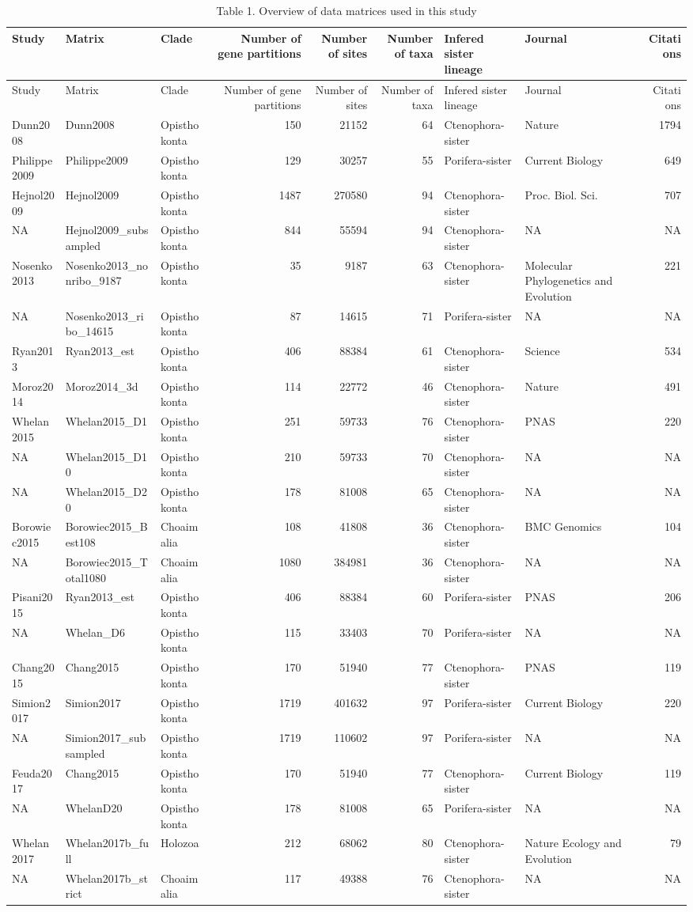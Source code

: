 \documentclass[]{article}
\begin{document}
\begin{longtable}[]{@{}lllrrrllr@{}}
\caption{Table 1. Overview of data matrices used in this
study}\tabularnewline
\toprule
Study & Matrix & Clade & Number of gene partitions & Number of sites &
Number of taxa & Infered sister lineage & Journal &
Citations\tabularnewline
\midrule
\endfirsthead
\toprule
Study & Matrix & Clade & Number of gene partitions & Number of sites &
Number of taxa & Infered sister lineage & Journal &
Citations\tabularnewline
\midrule
\endhead
Dunn2008 & Dunn2008 & Opisthokonta & 150 & 21152 & 64 &
Ctenophora-sister & Nature & 1794\tabularnewline
Philippe2009 & Philippe2009 & Opisthokonta & 129 & 30257 & 55 &
Porifera-sister & Current Biology & 649\tabularnewline
Hejnol2009 & Hejnol2009 & Opisthokonta & 1487 & 270580 & 94 &
Ctenophora-sister & Proc. Biol. Sci. & 707\tabularnewline
NA & Hejnol2009\_subsampled & Opisthokonta & 844 & 55594 & 94 &
Ctenophora-sister & NA & NA\tabularnewline
Nosenko2013 & Nosenko2013\_nonribo\_9187 & Opisthokonta & 35 & 9187 & 63
& Ctenophora-sister & Molecular Phylogenetics and Evolution &
221\tabularnewline
NA & Nosenko2013\_ribo\_14615 & Opisthokonta & 87 & 14615 & 71 &
Porifera-sister & NA & NA\tabularnewline
Ryan2013 & Ryan2013\_est & Opisthokonta & 406 & 88384 & 61 &
Ctenophora-sister & Science & 534\tabularnewline
Moroz2014 & Moroz2014\_3d & Opisthokonta & 114 & 22772 & 46 &
Ctenophora-sister & Nature & 491\tabularnewline
Whelan2015 & Whelan2015\_D1 & Opisthokonta & 251 & 59733 & 76 &
Ctenophora-sister & PNAS & 220\tabularnewline
NA & Whelan2015\_D10 & Opisthokonta & 210 & 59733 & 70 &
Ctenophora-sister & NA & NA\tabularnewline
NA & Whelan2015\_D20 & Opisthokonta & 178 & 81008 & 65 &
Ctenophora-sister & NA & NA\tabularnewline
Borowiec2015 & Borowiec2015\_Best108 & Choaimalia & 108 & 41808 & 36 &
Ctenophora-sister & BMC Genomics & 104\tabularnewline
NA & Borowiec2015\_Total1080 & Choaimalia & 1080 & 384981 & 36 &
Ctenophora-sister & NA & NA\tabularnewline
Pisani2015 & Ryan2013\_est & Opisthokonta & 406 & 88384 & 60 &
Porifera-sister & PNAS & 206\tabularnewline
NA & Whelan\_D6 & Opisthokonta & 115 & 33403 & 70 & Porifera-sister & NA
& NA\tabularnewline
Chang2015 & Chang2015 & Opisthokonta & 170 & 51940 & 77 &
Ctenophora-sister & PNAS & 119\tabularnewline
Simion2017 & Simion2017 & Opisthokonta & 1719 & 401632 & 97 &
Porifera-sister & Current Biology & 220\tabularnewline
NA & Simion2017\_subsampled & Opisthokonta & 1719 & 110602 & 97 &
Porifera-sister & NA & NA\tabularnewline
Feuda2017 & Chang2015 & Opisthokonta & 170 & 51940 & 77 &
Ctenophora-sister & Current Biology & 119\tabularnewline
NA & WhelanD20 & Opisthokonta & 178 & 81008 & 65 & Porifera-sister & NA
& NA\tabularnewline
Whelan2017 & Whelan2017b\_full & Holozoa & 212 & 68062 & 80 &
Ctenophora-sister & Nature Ecology and Evolution & 79\tabularnewline
NA & Whelan2017b\_strict & Choaimalia & 117 & 49388 & 76 &
Ctenophora-sister & NA & NA\tabularnewline
\bottomrule
\end{longtable}
\end{document}
